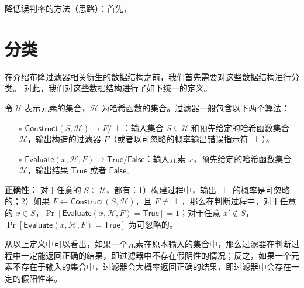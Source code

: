 降低误判率的方法（思路）：首先，

\section{分类}

在介绍布隆过滤器相关衍生的数据结构之前，我们首先需要对这些数据结构进行分类。
对此，我们对这些数据结构进行了如下统一的定义。

\begin{definition}
    令 $\mathcal{U}$ 表示元素的集合，$\mathcal{H}$ 为哈希函数的集合。过滤器一般包含以下两个算法：
    \begin{itemize}
    \item[$\circ$] $\mathsf{Construct}(S, \mathcal{H}) \to F/\perp$：输入集合 $S \subseteq \mathcal{U}$ 和预先给定的哈希函数集合 $\mathcal{H}$，输出构造的过滤器 $F$（或者以可忽略的概率输出错误指示符 $\perp$）。
    \item[$\circ$] $\mathsf{Evaluate}(x, \mathcal{H}, F) \to \mathsf{True} / \mathsf{False} $：输入元素 $x$，预先给定的哈希函数集合 $\mathcal{H}$，输出结果 $\mathsf{True}$ 或者 $\mathsf{False}$。
    \end{itemize}
\end{definition}

\textbf{正确性：} 对于任意的 $S \subseteq \mathcal{U}$，都有：1）构建过程中，输出 $\perp$ 的概率是可忽略的；2）如果 $F \gets \mathsf{Construct}(S, \mathcal{H})$，且 $F \neq \perp$，那么在判断过程中，对于任意的 $x \in S$，$\Pr[\mathsf{Evaluate}(x, \mathcal{H}, F) = \mathsf{True}] = 1$；对于任意 $x' \notin S$，$\Pr[\mathsf{Evaluate}(x, \mathcal{H}, F) = \mathsf{True}]$ 为可忽略的。

从以上定义中可以看出，如果一个元素在原本输入的集合中，那么过滤器在判断过程中一定能返回正确的结果，即过滤器中不存在假阴性的情况；反之，如果一个元素不存在于输入的集合中，过滤器会大概率返回正确的结果，即过滤器中会存在一定的假阳性率。

